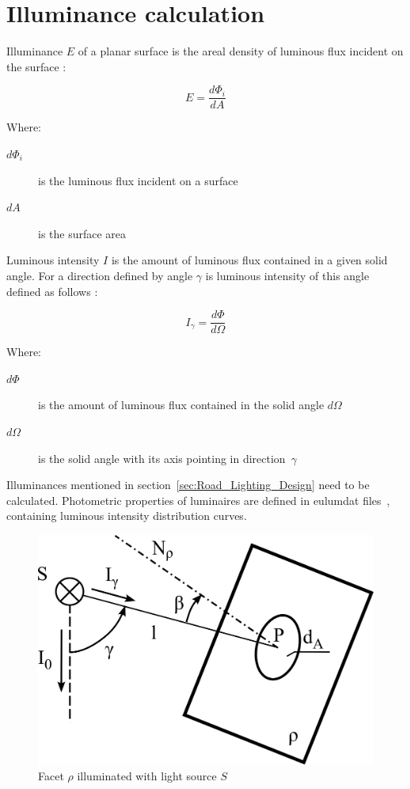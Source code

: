 \section{Illuminance calculation}
Illuminance $E$ of a planar surface is the areal density of luminous flux incident on the surface \cite{Habel}:

\begin{equation}
E=\frac{d\Phi_{i}}{dA}
\end{equation}

Where:
\begin{description}
	\item[$d\Phi_{i}$] is the luminous flux incident on a surface
	\item[$dA$] is the surface area
\end{description}

Luminous intensity $I$ is the amount of luminous flux contained in a given solid angle. For a direction defined by angle $\gamma$ is luminous intensity of this angle defined as follows \cite{Habel}:

\begin{equation}
I_{\gamma}=\frac{d\Phi}{d\Omega}
\end{equation}

Where:
\begin{description}
	\item[$d\Phi$] is the amount of luminous flux contained in the solid angle $d\Omega$
	\item[$d\Omega$] is the solid angle with its axis pointing in direction~$\gamma$
\end{description}

Illuminances mentioned in section~\ref{sec:Road_Lighting_Design} need to be calculated. Photometric properties of luminaires are defined in eulumdat files~\cite{Eulumdat}, containing luminous intensity distribution curves.

\begin{figure}[htb]
  \centering
  \includegraphics[width=0.8\columnwidth]{315_osvetlenost_bodovym_zdrojem}
  \caption{Facet $\rho$ illuminated with light source $S$}
  \label{fig:illuminance}
\end{figure}

